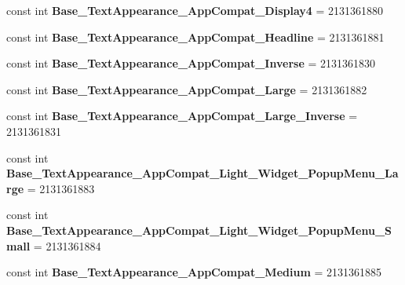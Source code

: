 \begin{DoxyCompactItemize}
const int {\bfseries Base\+\_\+\+Text\+Appearance\+\_\+\+App\+Compat\+\_\+\+Display4} = 2131361880
\item 
\mbox{\label{class_sample_app_1_1_droid_1_1_resource_1_1_style_a1d6b4819bc9c9b2637cd4507f8fa179a}} 
const int {\bfseries Base\+\_\+\+Text\+Appearance\+\_\+\+App\+Compat\+\_\+\+Headline} = 2131361881
\item 
\mbox{\label{class_sample_app_1_1_droid_1_1_resource_1_1_style_ad09383efd2d42488aafc1f7503f2b9e3}} 
const int {\bfseries Base\+\_\+\+Text\+Appearance\+\_\+\+App\+Compat\+\_\+\+Inverse} = 2131361830
\item 
\mbox{\label{class_sample_app_1_1_droid_1_1_resource_1_1_style_a552b9643b5568ee68f9d47aa96836961}} 
const int {\bfseries Base\+\_\+\+Text\+Appearance\+\_\+\+App\+Compat\+\_\+\+Large} = 2131361882
\item 
\mbox{\label{class_sample_app_1_1_droid_1_1_resource_1_1_style_a2939741df5241e476b7649e832e340d0}} 
const int {\bfseries Base\+\_\+\+Text\+Appearance\+\_\+\+App\+Compat\+\_\+\+Large\+\_\+\+Inverse} = 2131361831
\item 
\mbox{\label{class_sample_app_1_1_droid_1_1_resource_1_1_style_a7f5000ce6d144377eff3e3ab7da56816}} 
const int {\bfseries Base\+\_\+\+Text\+Appearance\+\_\+\+App\+Compat\+\_\+\+Light\+\_\+\+Widget\+\_\+\+Popup\+Menu\+\_\+\+Large} = 2131361883
\item 
\mbox{\label{class_sample_app_1_1_droid_1_1_resource_1_1_style_a11ac4c824d3b71ac537dfd11442ef765}} 
const int {\bfseries Base\+\_\+\+Text\+Appearance\+\_\+\+App\+Compat\+\_\+\+Light\+\_\+\+Widget\+\_\+\+Popup\+Menu\+\_\+\+Small} = 2131361884
\item 
\mbox{\label{class_sample_app_1_1_droid_1_1_resource_1_1_style_a7cbd523554a86e32d45e4ec6d307db35}} 
const int {\bfseries Base\+\_\+\+Text\+Appearance\+\_\+\+App\+Compat\+\_\+\+Medium} = 2131361885
\item 

\end{DoxyCompactItemize}
